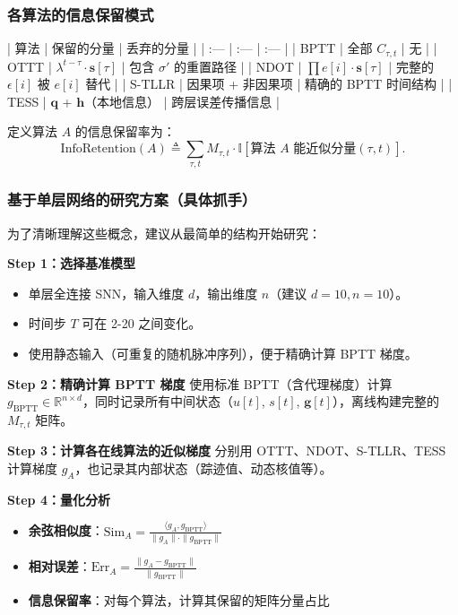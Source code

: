 \documentclass[journal,12pt,onecolumn]{IEEEtran}
\begin{document}
\subsubsection{各算法的信息保留模式}

| 算法 | 保留的分量 | 丢弃的分量 |
| :--- | :--- | :--- |
| BPTT | 全部 \(C_{\tau,t}\) | 无 |
| OTTT | \(\lambda^{t-\tau} \cdot \mathbf{s}[\tau]\) | 包含 \(\sigma'\) 的重置路径 |
| NDOT | \(\prod e[i] \cdot \mathbf{s}[\tau]\) | 完整的 \(\epsilon[i]\) 被 \(e[i]\) 替代 |
| S-TLLR | 因果项 + 非因果项 | 精确的 BPTT 时间结构 |
| TESS | \(\mathbf{q}\) + \(\mathbf{h}\)（本地信息） | 跨层误差传播信息 |

定义算法 \(A\) 的信息保留率为：
\[
\text{InfoRetention}(A) \triangleq
\sum_{\tau,t} M_{\tau,t} \cdot \mathbb{I}[\text{算法 }A\text{ 能近似分量}(\tau,t)].
\]

\subsubsection{基于单层网络的研究方案（具体抓手）}

为了清晰理解这些概念，建议从最简单的结构开始研究：

\textbf{Step 1：选择基准模型}
\begin{itemize}
    \item 单层全连接 SNN，输入维度 \(d\)，输出维度 \(n\)（建议 \(d=10, n=10\)）。
    \item 时间步 \(T\) 可在 2-20 之间变化。
    \item 使用静态输入（可重复的随机脉冲序列），便于精确计算 BPTT 梯度。
\end{itemize}

\textbf{Step 2：精确计算 BPTT 梯度}
使用标准 BPTT（含代理梯度）计算 \(g_{\text{BPTT}} \in \mathbb{R}^{n \times d}\)，同时记录所有中间状态（\(u[t]\), \(s[t]\), \(\mathbf{g}[t]\)），离线构建完整的 \(M_{\tau,t}\) 矩阵。

\textbf{Step 3：计算各在线算法的近似梯度}
分别用 OTTT、NDOT、S-TLLR、TESS 计算梯度 \(g_A\)，也记录其内部状态（踪迹值、动态核值等）。

\textbf{Step 4：量化分析}
\begin{itemize}
    \item \textbf{余弦相似度}：\(\text{Sim}_A = \frac{\langle g_A, g_{\text{BPTT}}\rangle}{\|g_A\| \cdot \|g_{\text{BPTT}}\|}\)
    \item \textbf{相对误差}：\(\text{Err}_A = \frac{\|g_A - g_{\text{BPTT}}\|}{\|g_{\text{BPTT}}\|}\)
    \item \textbf{信息保留率}：对每个算法，计算其保留的矩阵分量占比
\end{itemize}
\end{document}
